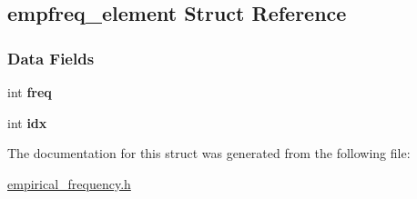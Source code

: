 \hypertarget{structempfreq__element}{}\subsection{empfreq\+\_\+element Struct Reference}
\label{structempfreq__element}
\subsubsection*{Data Fields}
\begin{DoxyCompactItemize}
\item 
\mbox{\label{structempfreq__element_ab424ac77789a11c1b7bc86b5286bba9f}} 
int {\bfseries freq}
\item 
\mbox{\label{structempfreq__element_a30040ae398445c3524708eb8838a1d16}} 
int {\bfseries idx}
\end{DoxyCompactItemize}


The documentation for this struct was generated from the following file\+:\begin{DoxyCompactItemize}
\item 
\hyperlink{empirical__frequency_8h}{empirical\+\_\+frequency.\+h}\end{DoxyCompactItemize}

